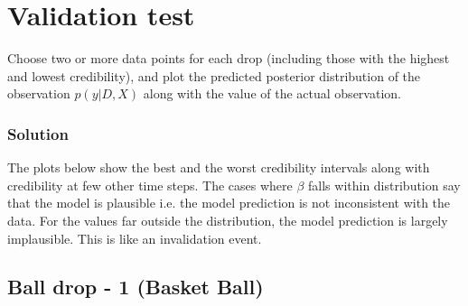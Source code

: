 \documentclass{article}
\begin{document}
\section{Validation test}

Choose two or more data points for each drop (including those with
the highest and lowest credibility), and plot the predicted posterior
distribution of the observation $p\left(y|D,X\right)$ along with
the value of the actual observation.


\subsubsection*{Solution}

The plots below show the best and the worst credibility intervals
along with credibility at few other time steps. The cases where $\beta$
falls within distribution say that the model is plausible \textendash{}
i.e. the model prediction is not inconsistent with the data. For the
values far outside the distribution, the model prediction is largely
implausible. This is like an invalidation event.


\subsection{Ball drop - 1 (Basket Ball) }
\end{document}
